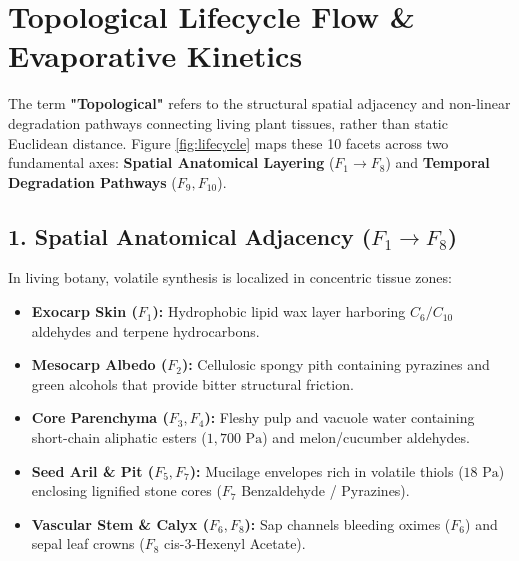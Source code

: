 \documentclass[11pt,a4paper]{article}
\begin{document}
\vspace{1em}

\section{Topological Lifecycle Flow \& Evaporative Kinetics}

The term \textbf{"Topological"} refers to the structural spatial adjacency and non-linear degradation pathways connecting living plant tissues, rather than static Euclidean distance. Figure \ref{fig:lifecycle} maps these 10 facets across two fundamental axes: \textbf{Spatial Anatomical Layering} ($F_1 \rightarrow F_8$) and \textbf{Temporal Degradation Pathways} ($F_9, F_{10}$).

\subsection{1. Spatial Anatomical Adjacency ($F_1 \rightarrow F_8$)}
In living botany, volatile synthesis is localized in concentric tissue zones:
\begin{itemize}[leftmargin=1.5em]
    \item \textbf{Exocarp Skin ($F_1$):} Hydrophobic lipid wax layer harboring $C_6/C_{10}$ aldehydes and terpene hydrocarbons.
    \item \textbf{Mesocarp Albedo ($F_2$):} Cellulosic spongy pith containing pyrazines and green alcohols that provide bitter structural friction.
    \item \textbf{Core Parenchyma ($F_3, F_4$):} Fleshy pulp and vacuole water containing short-chain aliphatic esters ($1,700\text{ Pa}$) and melon/cucumber aldehydes.
    \item \textbf{Seed Aril \& Pit ($F_5, F_7$):} Mucilage envelopes rich in volatile thiols ($18\text{ Pa}$) enclosing lignified stone cores ($F_7$ Benzaldehyde / Pyrazines).
    \item \textbf{Vascular Stem \& Calyx ($F_6, F_8$):} Sap channels bleeding oximes ($F_6$) and sepal leaf crowns ($F_8$ cis-3-Hexenyl Acetate).
\end{itemize}
\end{document}
